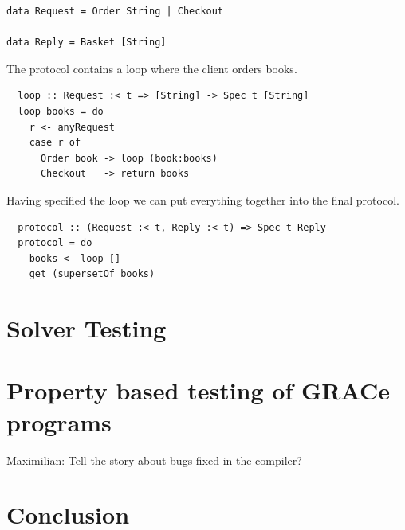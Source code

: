 \documentclass{article}
\begin{document}
\begin{verbatim}
data Request = Order String | Checkout

data Reply = Basket [String]
\end{verbatim}

The protocol contains a loop where the client orders books.

\begin{verbatim}
  loop :: Request :< t => [String] -> Spec t [String]
  loop books = do
    r <- anyRequest
    case r of
      Order book -> loop (book:books)
      Checkout   -> return books
\end{verbatim}

Having specified the loop we can put everything together into the final protocol.

\begin{verbatim}
  protocol :: (Request :< t, Reply :< t) => Spec t Reply
  protocol = do
    books <- loop []
    get (supersetOf books)
\end{verbatim}


\section{Solver Testing}



\section{Property based testing of GRACe programs}

Maximilian: Tell the story about bugs fixed in the compiler?



\section{Conclusion}
\end{document}
